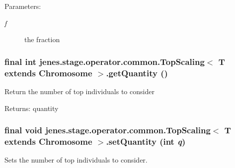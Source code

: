 \begin{Desc}
\item[Parameters:]
\begin{description}
\item[{\em f}]the fraction \end{description}
\end{Desc}
\hypertarget{classjenes_1_1stage_1_1operator_1_1common_1_1_top_scaling_3_01_t_01extends_01_chromosome_01_4_165fa24c31055aecd832e837419bad6f}{
\subsubsection[getQuantity]{\setlength{\rightskip}{0pt plus 5cm}final int jenes.stage.operator.common.TopScaling$<$ T extends Chromosome $>$.getQuantity ()}}
\label{classjenes_1_1stage_1_1operator_1_1common_1_1_top_scaling_3_01_t_01extends_01_chromosome_01_4_165fa24c31055aecd832e837419bad6f}


Return the number of top individuals to consider

\begin{Desc}
\item[Returns:]quantity \end{Desc}
\hypertarget{classjenes_1_1stage_1_1operator_1_1common_1_1_top_scaling_3_01_t_01extends_01_chromosome_01_4_53e27151e7c9b0b98e5c80e5018d2800}{
\subsubsection[setQuantity]{\setlength{\rightskip}{0pt plus 5cm}final void jenes.stage.operator.common.TopScaling$<$ T extends Chromosome $>$.setQuantity (int {\em q})}}
\label{classjenes_1_1stage_1_1operator_1_1common_1_1_top_scaling_3_01_t_01extends_01_chromosome_01_4_53e27151e7c9b0b98e5c80e5018d2800}


Sets the number of top individuals to consider. 

